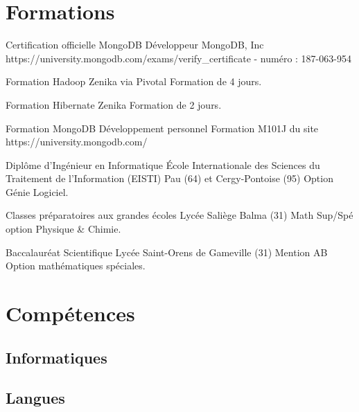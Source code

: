 \documentclass[11pt,a4paper]{moderncv}
\begin{document}
\section{Formations}

{Certification officielle MongoDB Développeur}
{MongoDB, Inc}
{}
{}
{https://university.mongodb.com/exams/verify\_certificate - numéro : 187-063-954}

{Formation Hadoop}
{Zenika via Pivotal}
{}
{}
{Formation de 4 jours.}

{Formation Hibernate}
{Zenika}
{}
{}
{Formation de 2 jours.}

{Formation MongoDB}
{Développement personnel}
{}
{}
{Formation M101J du site https://university.mongodb.com/}

{Diplôme d'Ingénieur en Informatique}
{\'Ecole Internationale des Sciences du Traitement de l’Information (EISTI)}
{Pau (64) et Cergy-Pontoise (95)}
{}
{Option Génie Logiciel.}

{Classes préparatoires aux grandes écoles}
{Lycée Saliège}
{Balma (31)}
{}
{Math Sup/Spé option Physique \& Chimie.}

{Baccalauréat Scientifique}
{Lycée}
{Saint-Orens de Gameville (31)}
{Mention AB}
{Option mathématiques spéciales.}

\section{Compétences}

\subsection{Informatiques}

\subsection{Langues}
\end{document}
